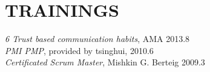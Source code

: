 
\section{TRAININGS}

{\em 6 Trust based communication habits}, AMA \hfill 2013.8
\\
{\em PMI PMP}, provided by tsinghui, \hfill 2010.6
\\
{\em Certificated Scrum Master}, Mishkin G. Berteig \hfill 2009.3

